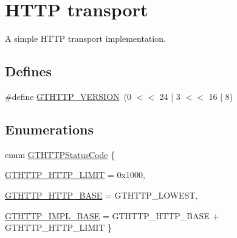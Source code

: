 \hypertarget{group__http}{
\section{HTTP transport}
\label{group__http}
}


A simple HTTP transport implementation.  


\subsection*{Defines}
\begin{DoxyCompactItemize}
\item 
\#define \hyperlink{group__http_gacf85f4c0d316a03db66a8ef24ddf3411}{GTHTTP\_\-VERSION}~(0 $<$$<$ 24 $|$ 3 $<$$<$ 16 $|$ 8)
\end{DoxyCompactItemize}
\subsection*{Enumerations}
\begin{DoxyCompactItemize}
\item 
enum \hyperlink{group__http_ga9f42032eb2905e40ee6fe84e0dfc03c2}{GTHTTPStatusCode} \{ \par
\hyperlink{group__http_gga9f42032eb2905e40ee6fe84e0dfc03c2a26adede81bf1a9366ba5c694071e7f7c}{GTHTTP\_\-HTTP\_\-LIMIT} =  0x1000, 
\par
\hyperlink{group__http_gga9f42032eb2905e40ee6fe84e0dfc03c2a196935519731c1937ef788ec01bf8e36}{GTHTTP\_\-HTTP\_\-BASE} =  GTHTTP\_\-LOWEST, 
\par
\hyperlink{group__http_gga9f42032eb2905e40ee6fe84e0dfc03c2a85676a04ec8467d5f486dbbb33b63a79}{GTHTTP\_\-IMPL\_\-BASE} =  GTHTTP\_\-HTTP\_\-BASE + GTHTTP\_\-HTTP\_\-LIMIT
 \}
\end{DoxyCompactItemize}
